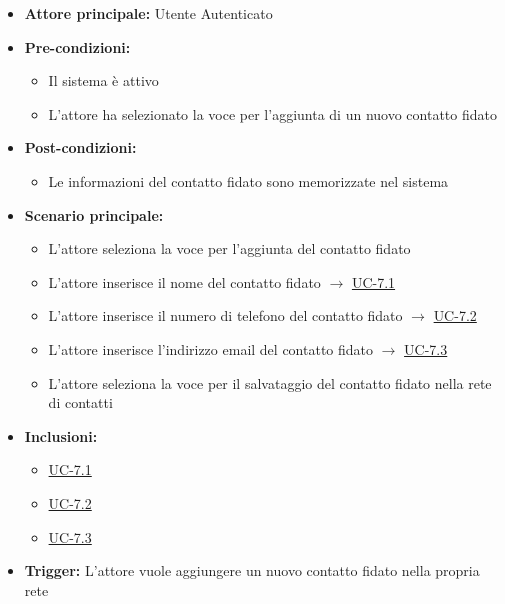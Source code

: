 \documentclass[a4paper,12pt]{article}
\begin{document}
\begin{itemize}
    \item \textbf{Attore principale:} Utente Autenticato
    \item \textbf{Pre-condizioni:} 
    \begin{itemize}
        \item Il sistema è attivo
        \item L'attore ha selezionato la voce per l'aggiunta di un nuovo contatto fidato
    \end{itemize}
    \item \textbf{Post-condizioni:}
    \begin{itemize}
        \item Le informazioni del contatto fidato sono memorizzate nel sistema
    \end{itemize}
    \item \textbf{Scenario principale:} 
    \begin{itemize}
        \item L'attore seleziona la voce per l'aggiunta del contatto fidato
        \item L'attore inserisce il nome del contatto fidato $\rightarrow$ \hyperref[subsec:UC-7.1]{UC-7.1}
        \item L'attore inserisce il numero di telefono del contatto fidato $\rightarrow$ \hyperref[subsec:UC-7.2]{UC-7.2}
        \item L'attore inserisce l'indirizzo email del contatto fidato $\rightarrow$ \hyperref[subsec:UC-7.3]{UC-7.3}
        \item L'attore seleziona la voce per il salvataggio del contatto fidato nella rete di contatti
    \end{itemize}
    \item \textbf{Inclusioni:}
    \begin{itemize}
        \item \hyperref[subsec:UC-7.1]{UC-7.1}
        \item \hyperref[subsec:UC-7.2]{UC-7.2}
        \item \hyperref[subsec:UC-7.3]{UC-7.3}
    \end{itemize}
    \item \textbf{Trigger:} L'attore vuole aggiungere un nuovo contatto fidato nella propria rete
\end{itemize}
\end{document}
